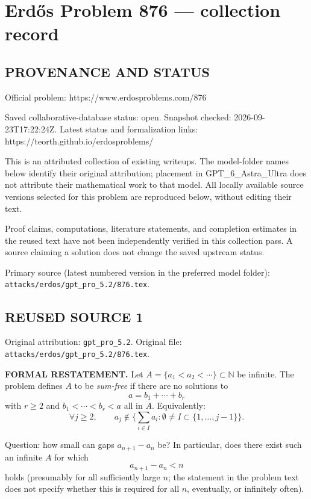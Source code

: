 \section*{Erd\H{o}s Problem 876 --- collection record}

\subsection*{PROVENANCE AND STATUS}
Official problem: https://www.erdosproblems.com/876

Saved collaborative-database status: open.
Snapshot checked: 2026-09-23T17:22:24Z.
Latest status and formalization links: https://teorth.github.io/erdosproblems/

This is an attributed collection of existing writeups. The model-folder names below identify their original attribution; placement in GPT\_6\_Astra\_Ultra does not attribute their mathematical work to that model. All locally available source versions selected for this problem are reproduced below, without editing their text.

Proof claims, computations, literature statements, and completion estimates in the reused text have not been independently verified in this collection pass. A source claiming a solution does not change the saved upstream status.

Primary source (latest numbered version in the preferred model folder): \texttt{attacks/erdos/gpt\_pro\_5.2/876.tex}.

\subsection*{REUSED SOURCE 1}
Original attribution: \texttt{gpt\_pro\_5.2}.
Original file: \texttt{attacks/erdos/gpt\_pro\_5.2/876.tex}.


\noindent\textbf{FORMAL RESTATEMENT.}
Let $A=\{a_1<a_2<\cdots\}\subset\mathbb N$ be infinite.
The problem defines $A$ to be \emph{sum-free} if there are no solutions to
\[
 a=b_1+\cdots+b_r
\]
with $r\ge 2$ and $b_1<\cdots<b_r<a$ all in $A$.
Equivalently:
\[
\forall j\ge 2,\qquad a_j\notin \Big\{\sum_{i\in I} a_i: \emptyset\neq I\subset\{1,\dots,j-1\}\Big\}.
\]

Question: how small can gaps $a_{n+1}-a_n$ be? In particular, does there exist such an infinite $A$ for which
\[
 a_{n+1}-a_n < n
\]
holds (presumably for all sufficiently large $n$; the statement in the problem text does not specify whether this is required for all $n$, eventually, or infinitely often).

